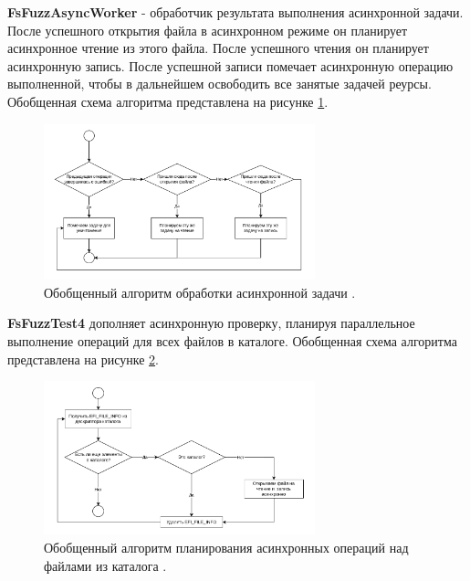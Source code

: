 \textbf{FsFuzzAsyncWorker} - обработчик результата выполнения асинхронной задачи. После успешного открытия файла в асинхронном режиме он планирует асинхронное чтение из этого файла. После успешного  чтения он планирует асинхронную запись. После успешной записи  помечает асинхронную операцию выполненной, чтобы в дальнейшем освободить все занятые  задачей реурсы. Обобщенная схема алгоритма представлена на рисунке \ref{met:pic:fsfuzzasyncworker}.
\begin{figure}[h]
	\centering %
	\includegraphics[width=0.7\textwidth]{FsFyzzAsyncWorker.pdf} %
	\caption{Обобщенный алгоритм обработки асинхронной задачи .} %
	\label{met:pic:fsfuzzasyncworker} %
\end{figure}

\newpage
\textbf{FsFuzzTest4} дополняет асинхронную проверку, планируя параллельное выполнение операций  для всех файлов в каталоге. Обобщенная схема алгоритма представлена на рисунке \ref{met:pic:fsfuzztestiv}.
\begin{figure}[htbp]
	\centering %
	\includegraphics[width=0.7\textwidth]{FsFuzzIV.pdf} %
	\caption{Обобщенный алгоритм планирования асинхронных операций над файлами из каталога .} %
	\label{met:pic:fsfuzztestiv} %
\end{figure}

